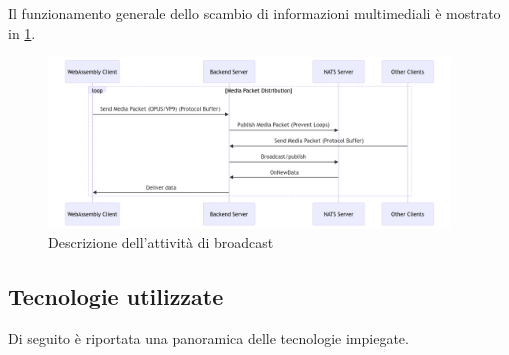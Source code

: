 \documentclass{article}
\begin{document}
Il funzionamento generale dello scambio di informazioni multimediali è mostrato in 
\cref{fig:sq-media}.

\begin{figure}
  \begin{center}
    \includegraphics[width=0.95\textwidth]{figures/sq_media_delivery.png}
  \end{center}
  \caption{Descrizione dell'attività di broadcast}\label{fig:sq-media}
\end{figure}



\subsection{Tecnologie utilizzate}
Di seguito è riportata una panoramica delle tecnologie impiegate. 
\end{document}
